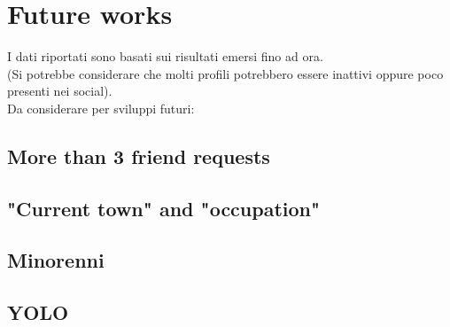 
\chapter{Future works}
\label{cap:future-works}
I dati riportati sono basati sui risultati emersi fino ad ora.\\(Si potrebbe considerare che molti profili potrebbero essere inattivi oppure poco presenti nei social). \\Da considerare per sviluppi futuri:
\section{More than 3 friend requests}

\section{"Current town" and "occupation"}

\section{Minorenni}

\section{YOLO}

